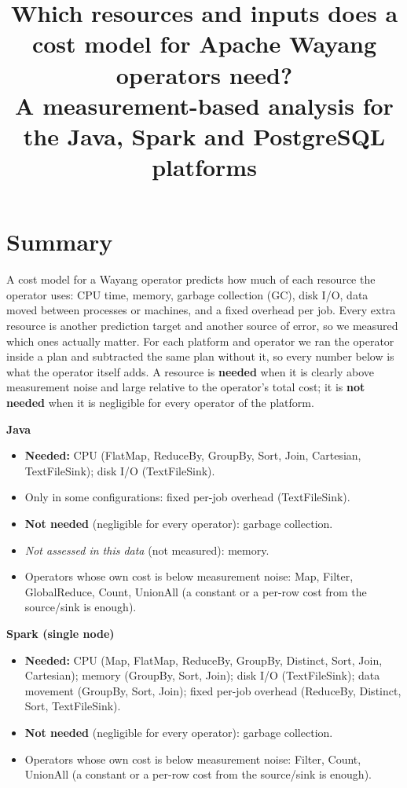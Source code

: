 \documentclass[11pt,a4paper]{article}
\title{Which resources and inputs does a cost model for Apache Wayang operators need?\\[2pt]\large A measurement-based analysis for the Java, Spark and PostgreSQL platforms}
\author{}\date{}
\newcommand{\hl}[1]{\textbf{#1}}
\begin{document}
\maketitle
\section{Summary}

A cost model for a Wayang operator predicts how much of each resource the operator uses: CPU time, memory, garbage collection (GC), disk I/O, data moved between processes or machines, and a fixed overhead per job. Every extra resource is another prediction target and another source of error, so we measured which ones actually matter. For each platform and operator we ran the operator inside a plan and subtracted the same plan without it, so every number below is what the operator itself adds. A resource is \hl{needed} when it is clearly above measurement noise and large relative to the operator's total cost; it is \hl{not needed} when it is negligible for every operator of the platform.

\textbf{Java}\vspace{-0.3em}\begin{itemize}\itemsep0pt
\item \hl{Needed:} CPU (FlatMap, ReduceBy, GroupBy, Sort, Join, Cartesian, TextFileSink); disk I/O (TextFileSink).
\item Only in some configurations: fixed per-job overhead (TextFileSink).
\item \hl{Not needed} (negligible for every operator): garbage collection.
\item \emph{Not assessed in this data} (not measured): memory.
\item Operators whose own cost is below measurement noise: Map, Filter, GlobalReduce, Count, UnionAll (a constant or a per-row cost from the source/sink is enough).
\end{itemize}

\textbf{Spark (single node)}\vspace{-0.3em}\begin{itemize}\itemsep0pt
\item \hl{Needed:} CPU (Map, FlatMap, ReduceBy, GroupBy, Distinct, Sort, Join, Cartesian); memory (GroupBy, Sort, Join); disk I/O (TextFileSink); data movement (GroupBy, Sort, Join); fixed per-job overhead (ReduceBy, Distinct, Sort, TextFileSink).
\item \hl{Not needed} (negligible for every operator): garbage collection.
\item Operators whose own cost is below measurement noise: Filter, Count, UnionAll (a constant or a per-row cost from the source/sink is enough).
\end{itemize}
\end{document}
